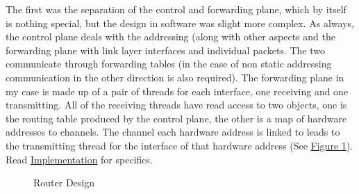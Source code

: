 \documentclass[12pt,a4paper,twoside,openright]{report}
\begin{document}
\bigskip

The first was the separation of the control and forwarding plane, which by itself is nothing special, but the design in software was slight more complex.  As always, the control plane deals with the addressing (along with other aspects and the forwarding plane with link layer interfaces and individual packets.  The two communicate through forwarding tables (in the case of non static addressing communication in the other direction is also required). The forwarding plane in my case is made up of a pair of threads for each interface, one receiving and one transmitting. All of the receiving threads have read access to two objects, one is the routing table produced by the control plane, the other is a map of hardware addresses to channels.  The channel each hardware address is linked to leads to the transmitting thread for the interface of that hardware address (See \hyperref[fig::router_design]{Figure }\ref{fig::router_design}). Read \hyperref[chap::implementation]{Implementation} for specifics.

\begin{figure}
\centering
{}
\caption{Router Design}
\label{fig::router_design}
\end{figure}
\end{document}
